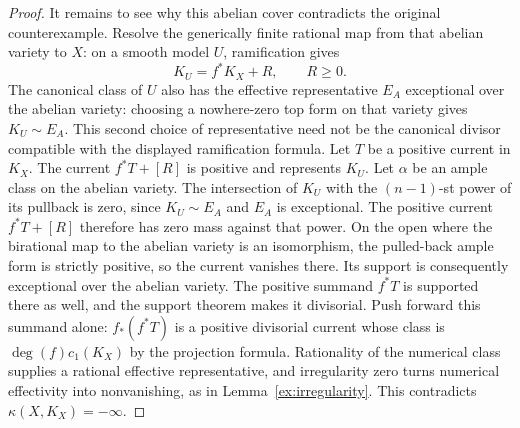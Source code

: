 \begin{proof}
It remains to see why this abelian cover contradicts the original
counterexample.  Resolve the generically finite rational map from
that abelian variety to \(X\):
on a smooth model \(U\), ramification gives
\[
 K_U=f^*K_X+R,\qquad R\ge0.
\]
The canonical class of \(U\) also has the effective representative
\(E_A\) exceptional over the abelian variety: choosing a nowhere-zero
top form on that variety gives \(K_U\sim E_A\). This second choice
of representative need not be the canonical divisor compatible with
the displayed ramification formula. Let \(T\) be a positive current in \(K_X\).
The current \(f^*T+[R]\) is positive and represents \(K_U\).
Let \(\alpha\) be an ample class on the abelian variety. The
intersection of \(K_U\) with the \((n-1)\)-st power of its pullback
is zero, since \(K_U\sim E_A\) and \(E_A\) is exceptional.
The positive current \(f^*T+[R]\) therefore has zero mass against
that power. On the open where the birational map to the abelian
variety is an isomorphism, the pulled-back ample form is strictly
positive, so the current vanishes there. Its support is consequently
exceptional over the abelian variety. The positive summand \(f^*T\)
is supported there as well, and the support theorem makes it divisorial.
Push forward this summand alone: \(f_*(f^*T)\) is a positive
divisorial current whose class is \(\deg(f)c_1(K_X)\) by the
projection formula.  Rationality of the numerical class supplies
a rational effective representative, and irregularity zero turns
numerical effectivity into nonvanishing, as in
Lemma~\ref{ex:irregularity}.  This contradicts
\(\kappa(X,K_X)=-\infty\).
\end{proof}

